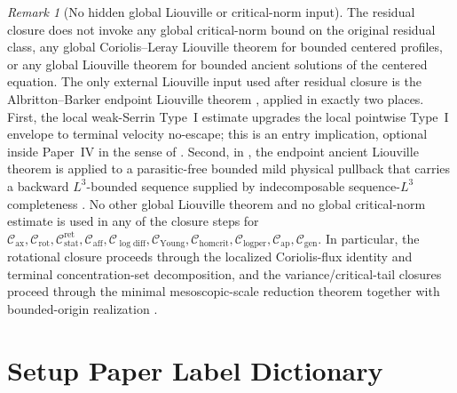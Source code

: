 \documentclass[11pt]{amsart}
\numberwithin{equation}{section}
\theoremstyle{plain}
\theoremstyle{definition}
\theoremstyle{remark}
\newtheorem{remark}[remark]{Remark}
\newcommand{\Cax}{\mathcal C_{\mathrm{ax}}}
\newcommand{\Crot}{\mathcal C_{\mathrm{rot}}}
\newcommand{\Cstat}{\mathcal C_{\mathrm{stat}}^{\mathrm{ret}}}
\newcommand{\Caff}{\mathcal C_{\mathrm{aff}}}
\newcommand{\Cgen}{\mathcal C_{\mathrm{gen}}}
\newcommand{\Chomcrit}{\mathcal C_{\mathrm{homcrit}}}
\newcommand{\Clogper}{\mathcal C_{\mathrm{logper}}}
\newcommand{\Capcrit}{\mathcal C_{\mathrm{ap}}}
\newcommand{\Cyoung}{\mathcal C_{\mathrm{Young}}}
\newcommand{\Clogdiff}{\mathcal C_{\log\mathrm{diff}}}
\begin{document}
\begin{remark}[No hidden global Liouville or critical-norm input]
\label{rem:no-hidden-global-liouville}
The residual closure does not invoke any global critical-norm bound on the
original residual class, any global Coriolis--Leray Liouville theorem for
bounded centered profiles, or any global Liouville theorem for bounded ancient
solutions of the centered equation.  The only external Liouville input used
after residual closure is the Albritton--Barker endpoint Liouville theorem
, applied in exactly two places.  First, the local
weak-Serrin Type~I estimate
upgrades the local pointwise Type~I envelope to terminal velocity
no-escape; this is an entry implication, optional inside Paper~IV in the sense
of .  Second, in
, the endpoint ancient Liouville theorem is applied
to a parasitic-free bounded mild physical pullback that carries a backward
\(L^3\)-bounded sequence supplied by indecomposable sequence-\(L^3\)
completeness .  No other global Liouville
theorem and no global critical-norm estimate is used in any of the closure
steps for \(\Cax,\Crot,\Cstat,\Caff,\Clogdiff,\Cyoung,\Chomcrit,\Clogper,
\Capcrit,\Cgen\).  In particular, the rotational closure
 proceeds through the localized Coriolis-flux
identity and terminal concentration-set decomposition, and the variance/critical-tail
closures proceed through the minimal mesoscopic-scale reduction theorem
 together with bounded-origin
realization .
\end{remark}

\appendix

\section{Setup Paper Label Dictionary}
\label{app:setup-label-dictionary}
\end{document}
